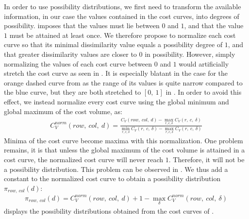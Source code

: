 In order to use possibility distributions, we first need to transform the available information, in our case the values contained in the cost curves, into degrees of possibility.  imposes that the values must lie between $0$ and $1$, and that the value $1$ must be attained at least once. We therefore propose to normalize each cost curve so that its minimal dissimilarity value equals a possibility degree of $1$, and that greater dissimilarity values are closer to $0$ in possibility. However, simply normalizing the values of each cost curve between $0$ and $1$ would artificially stretch the cost curve as seen in . It is especially blatant in the case for the orange dashed curve from  as the range of its values is quite narrow compared to the blue curve, but they are both stretched to $[0,~1]$ in . In order to avoid this effect, we instead normalize every cost curve using the global minimum and global maximum of the cost volume, as:
\begin{align}
	C_V^{norm}(row, ~col, ~d) = \frac{C_V(row, ~col, ~d) - \max_{r,c,\delta}C_V(r,~c,~\delta)}{\min_{r,c,\delta}C_V(r,~c,~\delta) - \max_{r,c,\delta}C_V(r,~c,~\delta)}\label{eq:normalized_cost_curve}
\end{align}
Minima of the cost curve become maxima with this normalization. One problem remains, it is that unless the global maximum of the cost volume is attained in a cost curve, the normalized cost curve will never reach $1$. Therefore, it will not be a possibility distribution. This problem can be observed in . We thus add a constant to the normalized cost curve to obtain a possibility distribution $\pi_{row,~col}(d)$:
\begin{align}
	\pi_{row,~col}(d) = C_V^{norm}(row, ~col, ~d) + 1 - \max_\delta C_V^{norm}(row, ~col, ~\delta)\label{eq:possibility_cost_curve}
\end{align}
 displays the possibility distributions obtained from the cost curves of .

